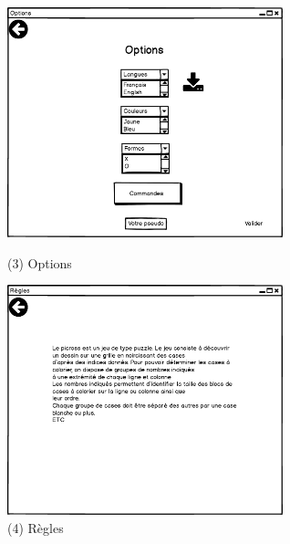 \documentclass{report}
\begin{document}
	\begin{figure}[H]
    		\begin{minipage}[c]{.46\linewidth}
       			\centering
       			\includegraphics[width=8cm]{Maquettes/Options.png}
        			\caption{(3) Options}
    		\end{minipage}
    		\hfill
   		\begin{minipage}[c]{.46\linewidth}
        			\centering
       			 \includegraphics[width=8cm]{Maquettes/Regles.png}
        			\caption{(4) Règles}
    		\end{minipage}
	\end{figure}
	
\end{document}
